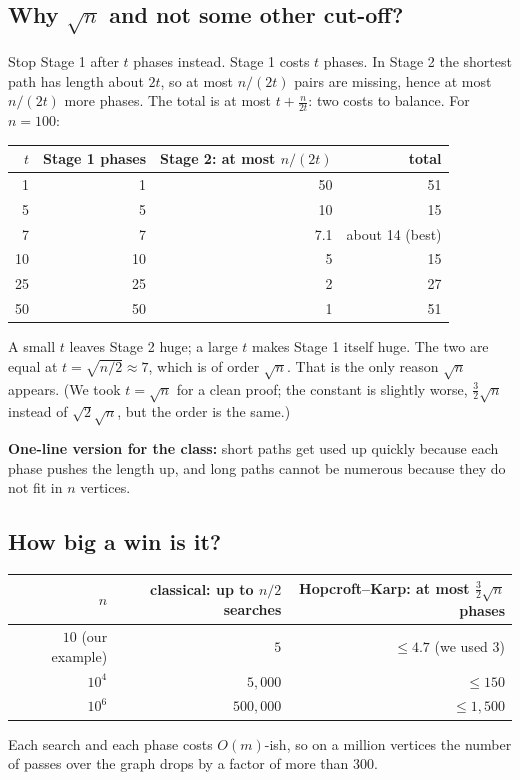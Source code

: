\documentclass[11pt,a4paper]{article}
\begin{document}
\subsection*{Why $\sqrt n$ and not some other cut-off?}
Stop Stage 1 after $t$ phases instead. Stage 1 costs $t$ phases. In Stage 2 the shortest path has length about $2t$, so at most $n/(2t)$ pairs are missing, hence at most $n/(2t)$ more phases. The total is at most $t+\frac n{2t}$: two costs to balance. For $n=100$:
\begin{center}
\begin{tabular}{@{}rrrr@{}}
\toprule
$t$ & Stage 1 phases & Stage 2: at most $n/(2t)$ & total\\\midrule
1 & 1 & 50 & 51\\
5 & 5 & 10 & 15\\
7 & 7 & 7.1 & about 14 (best)\\
10 & 10 & 5 & 15\\
25 & 25 & 2 & 27\\
50 & 50 & 1 & 51\\\bottomrule
\end{tabular}
\end{center}
A small $t$ leaves Stage 2 huge; a large $t$ makes Stage 1 itself huge. The two are equal at $t=\sqrt{n/2}\approx7$, which is of order $\sqrt n$. That is the only reason $\sqrt n$ appears. (We took $t=\sqrt n$ for a clean proof; the constant is slightly worse, $\frac32\sqrt n$ instead of $\sqrt2\sqrt n$, but the order is the same.)

\textbf{One-line version for the class:} short paths get used up quickly because each phase pushes the length up, and long paths cannot be numerous because they do not fit in $n$ vertices.

\subsection*{How big a win is it?}
\begin{center}
\begin{tabular}{@{}rrr@{}}
\toprule
$n$ & classical: up to $n/2$ searches & Hopcroft--Karp: at most $\frac32\sqrt n$ phases\\\midrule
$10$ (our example) & $5$ & $\le 4.7$ (we used 3)\\
$10^4$ & $5{,}000$ & $\le150$\\
$10^6$ & $500{,}000$ & $\le1{,}500$\\\bottomrule
\end{tabular}
\end{center}
Each search and each phase costs $O(m)$-ish, so on a million vertices the number of passes over the graph drops by a factor of more than 300.
\end{document}

